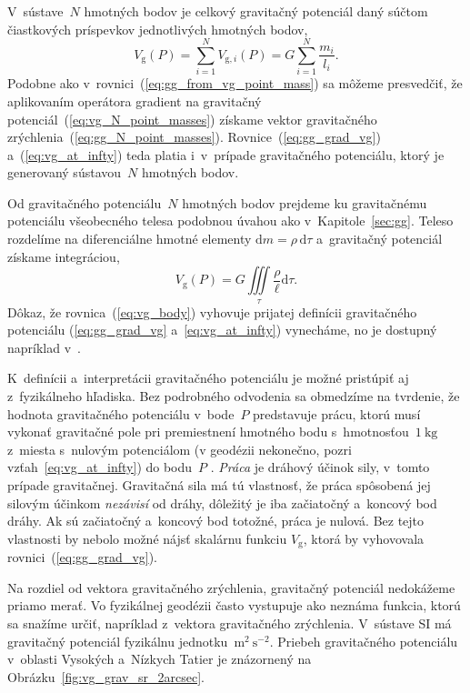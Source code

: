 \documentclass[a4paper,12pt]{book}
\newcommand{\diff}{\mathrm d}
\newcommand{\gidx}{\mathrm g}
\begin{document}
V~sústave~$N$ hmotných bodov je celkový gravitačný potenciál daný súčtom
čiastkových príspevkov jednotlivých hmotných bodov,
%
\begin{equation}
\label{eq:vg_N_point_masses}
V_\gidx(P) = \sum_{i = 1}^{N} V_{\gidx,i}(P) = G \sum_{i = 1}^{N}\frac{
m_i}{l_i}{.}
\end{equation}
%
Podobne ako v~rovnici~(\ref{eq:gg_from_vg_point_mass}) sa môžeme presvedčiť, že 
aplikovaním operátora gradient na gravitačný
potenciál~(\ref{eq:vg_N_point_masses}) získame vektor gravitačného
zrýchlenia~(\ref{eq:gg_N_point_masses}).  Rovnice~(\ref{eq:gg_grad_vg}) 
a~(\ref{eq:vg_at_infty}) teda platia i~v~prípade gravitačného
potenciálu, ktorý je generovaný sústavou~$N$ hmotných bodov.

Od gravitačného potenciálu~$N$ hmotných bodov prejdeme ku
gravitačnému potenciálu všeobecného telesa podobnou úvahou ako
v~Kapitole~\ref{sec:gg}.  Teleso rozdelíme na diferenciálne hmotné elementy
$\diff m = \rho \, \diff \tau$ a~gravitačný potenciál získame integráciou,
%
\begin{equation}
\label{eq:vg_body}
V_\gidx(P) = G \iiint\limits_{\tau} \frac{\rho}{\ell} \diff\tau{.}
\end{equation}
%
Dôkaz, že rovnica~(\ref{eq:vg_body}) vyhovuje prijatej definícii gravitačného
potenciálu (\ref{eq:gg_grad_vg} a~\ref{eq:vg_at_infty}) vynecháme, no je
dostupný napríklad v~\textcite{MacMillan1930}.

K~definícii a~interpretácii gravitačného potenciálu je možné pristúpiť aj 
z~fyzikálneho hľadiska.  Bez podrobného odvodenia sa obmedzíme na tvrdenie, že 
hodnota gravitačného potenciálu v~bode~$P$ predstavuje prácu, ktorú musí 
vykonať gravitačné pole pri premiestnení hmotného bodu s~hmotnosťou~$1\ 
\mathrm{kg}$ z~miesta s~nulovým potenciálom (v geodézii nekonečno, pozri 
vzťah~\ref{eq:vg_at_infty}) do bodu~$P$ 
\parencite{MacMillan1930,Kellogg1967,TorgeGeodesy}.  \emph{Práca} je dráhový 
účinok sily, v~tomto prípade gravitačnej.  Gravitačná sila má tú vlastnosť, že 
práca spôsobená jej silovým účinkom \emph{nezávisí} od dráhy, dôležitý je iba 
začiatočný a~koncový bod dráhy.  Ak sú začiatočný a~koncový bod totožné, práca 
je nulová.  Bez tejto vlastnosti by nebolo možné nájsť skalárnu funkciu 
$V_\gidx$, ktorá by vyhovovala rovnici~(\ref{eq:gg_grad_vg}).

Na rozdiel od vektora gravitačného zrýchlenia, gravitačný potenciál nedokážeme
priamo merať.  Vo fyzikálnej geodézii často vystupuje ako neznáma funkcia,
ktorú sa snažíme určiť, napríklad z~vektora gravitačného zrýchlenia.  V~sústave
SI má gravitačný potenciál fyzikálnu jednotku~$\mathrm{m}^2\ \mathrm{s}^{-2}$.
Priebeh gravitačného potenciálu v~oblasti Vysokých a~Nízkych Tatier je
znázornený na Obrázku~\ref{fig:vg_grav_sr_2arcsec}.
\end{document}
